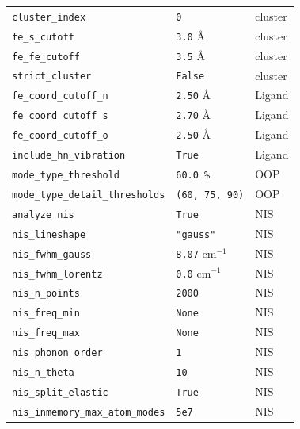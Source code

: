 \documentclass[11pt,a4paper,twoside]{article}
\theoremstyle{remark}
\begin{document}
\begin{longtable}{p{} p{} p{}}
\midrule
\texttt{cluster\_index}             & \texttt{0}           & cluster \\
\texttt{fe\_s\_cutoff}              & \texttt{3.0} \AA     & cluster \\
\texttt{fe\_fe\_cutoff}             & \texttt{3.5} \AA     & cluster \\
\texttt{strict\_cluster}            & \texttt{False}       & cluster \\
\midrule
\texttt{fe\_coord\_cutoff\_n}       & \texttt{2.50} \AA    & Ligand \\
\texttt{fe\_coord\_cutoff\_s}       & \texttt{2.70} \AA    & Ligand \\
\texttt{fe\_coord\_cutoff\_o}       & \texttt{2.50} \AA    & Ligand \\
\texttt{include\_hn\_vibration}     & \texttt{True}        & Ligand \\
\midrule
\texttt{mode\_type\_threshold}      & \texttt{60.0\,\%}    & OOP \\
\texttt{mode\_type\_detail\_thresholds} & \texttt{(60, 75, 90)} & OOP \\
\midrule
\texttt{analyze\_nis}               & \texttt{True}        & NIS \\
\texttt{nis\_lineshape}             & \texttt{"gauss"}     & NIS \\
\texttt{nis\_fwhm\_gauss}           & \texttt{8.07} cm$^{-1}$ & NIS \\
\texttt{nis\_fwhm\_lorentz}         & \texttt{0.0} cm$^{-1}$  & NIS \\
\texttt{nis\_n\_points}             & \texttt{2000}        & NIS \\
\texttt{nis\_freq\_min}             & \texttt{None}        & NIS \\
\texttt{nis\_freq\_max}             & \texttt{None}        & NIS \\
\texttt{nis\_phonon\_order}         & \texttt{1}           & NIS \\
\texttt{nis\_n\_theta}              & \texttt{10}          & NIS \\
\texttt{nis\_split\_elastic}        & \texttt{True}        & NIS \\
\texttt{nis\_inmemory\_max\_atom\_modes} & \texttt{5e7}    & NIS \\
\midrule

\end{longtable}
\end{document}
